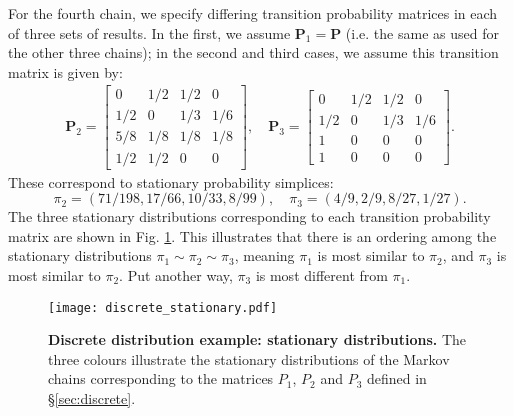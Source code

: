 \documentclass{article}
\begin{document}
For the fourth chain, we specify differing transition probability matrices in each of three sets of results. In the first, we assume $\boldsymbol{P}_1=\boldsymbol{P}$ (i.e. the same as used for the other three chains); in the second and third cases, we assume this transition matrix is given by:
%
\begin{gather}
\boldsymbol{P}_2
=
\begin{bmatrix}
0 & 1/2 & 1/2 & 0\\
1/2 & 0 & 1/3 & 1/6\\
5/8 & 1/8 & 1/8 & 1/8\\
1/2 & 1/2 & 0 & 0
\end{bmatrix},\quad
\boldsymbol{P}_3
=
\begin{bmatrix}
0 & 1/2 & 1/2 & 0\\
1/2 & 0 & 1/3 & 1/6\\
1 & 0 & 0 & 0\\
1 & 0 & 0 & 0
\end{bmatrix}.
\end{gather}
%
These correspond to stationary probability simplices:
%
\begin{equation}
\pi_2 = (71/198, 17/66, 10/33, 8/99), \quad \pi_3 = (4/9, 2/9, 8/27, 1/27).
\end{equation}
%
The three stationary distributions corresponding to each transition probability matrix are shown in Fig. \ref{fig:discrete_stationary}. This illustrates that there is an ordering among the stationary distributions $\pi_1\sim\pi_2\sim\pi_3$, meaning $\pi_1$ is most similar to $\pi_2$, and $\pi_3$ is most similar to $\pi_2$. Put another way, $\pi_3$ is most different from $\pi_1$.

\begin{figure}[!htb]
	\centerline{\texttt{[image: discrete\_stationary.pdf]}}
	\caption{\textbf{Discrete distribution example: stationary distributions.} The three colours illustrate the stationary distributions of the Markov chains corresponding to the matrices $P_1$, $P_2$ and $P_3$ defined in \S\ref{sec:discrete}.}
	\label{fig:discrete_stationary}
\end{figure}
\end{document}
